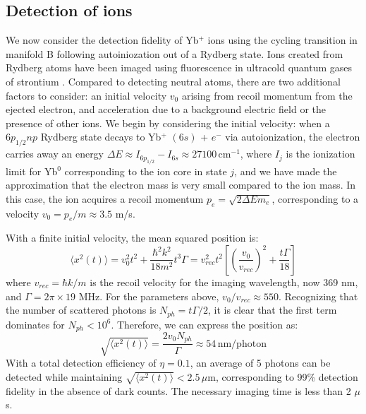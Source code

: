 \documentclass[%
reprint,
superscriptaddress,
 amsmath,amssymb,
 aps,
 prx,
floatfix,
]{revtex4-1}
\begin{document}
\subsection{Detection of ions}
We now consider the detection fidelity of Yb$^{+}$ ions using the cycling transition in manifold B following autoiniozation out of a Rydberg state. Ions created from Rydberg atoms have been imaged using fluorescence in ultracold quantum gases of strontium \cite{mcquillen2013}. Compared to detecting neutral atoms, there are two additional factors to consider: an initial velocity $v_0$ arising from recoil momentum from the ejected electron, and acceleration due to a background electric field or the presence of other ions. We begin by considering the initial velocity: when a $6p_{1/2}np$ Rydberg state decays to Yb$^+$ $(6s)$ + $e^-$ via autoionization, the electron carries away an energy $\Delta E \approx I_{6p_{1/2}} - I_{6s} \approx 27100\, \textrm{cm}^{-1}$, where $I_{j}$ is the ionization limit for Yb$^0$ corresponding to the ion core in state $j$, and we have made the approximation that the electron mass is very small compared to the ion mass. In this case, the ion acquires a recoil momentum $p_{e} = \sqrt{2 \Delta E m_e}$, corresponding to a velocity $v_0 = p_{e}/m \approx 3.5$ m/s.

With a finite initial velocity, the mean squared position is:
\begin{equation}
\langle x^2(t) \rangle = v_0^2 t^2 + \frac{\hbar^2 k^2}{18 m^2} t^3 \Gamma = v_{rec}^2 t^2 \left[\left(\frac{v_0}{v_{rec}}\right)^2 + \frac{t \Gamma}{18}\right]
\end{equation}
where $v_{rec} = \hbar k/m$ is the recoil velocity for the imaging wavelength, now 369 nm, and $\Gamma = 2\pi \times 19$ MHz. For the parameters above, $v_0/v_{rec} \approx 550$. Recognizing that the number of scattered photons is $N_{ph} = t \Gamma/2$, it is clear that the first term dominates for $N_{ph} < 10^6$. Therefore, we can express the position as:
\begin{equation}
\sqrt{\langle x^2(t) \rangle} = \frac{2 v_0 N_{ph}}{\Gamma} \approx 54\, \textrm{nm/photon}
\end{equation}
With a total detection efficiency of $\eta = 0.1$, an average of 5 photons can be detected while maintaining  $\sqrt{\langle x^2(t) \rangle } < 2.5\,\mu$m, corresponding to 99\% detection fidelity in the absence of dark counts. The necessary imaging time is less than 2 $\mu$s.
\end{document}
